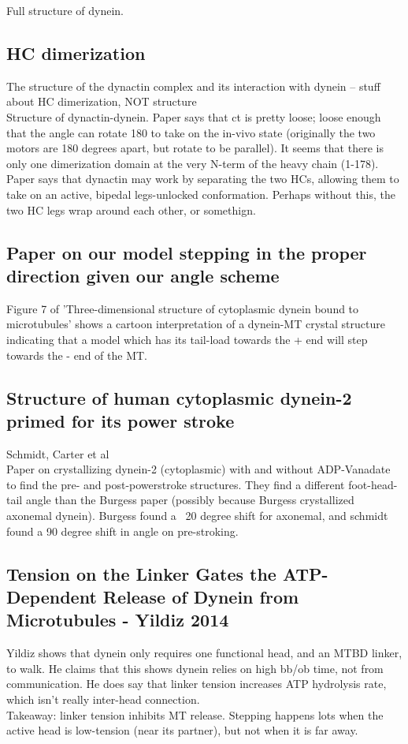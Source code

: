\documentclass[10pt]{article} %
\begin{document}
Full structure of dynein.\\

\subsection{HC dimerization}
The structure of the dynactin complex and its interaction with dynein -- stuff about HC dimerization, NOT structure\\

Structure of dynactin-dynein. Paper says that ct is pretty loose; loose enough that the angle can rotate 180 to take on the in-vivo state (originally the two motors are 180 degrees apart, but rotate to be parallel). It seems that there is only one dimerization domain at the very N-term of the heavy chain (1-178).\\

Paper says that dynactin may work by separating the two HCs, allowing them to take on an active, bipedal legs-unlocked conformation. Perhaps without this, the two HC legs wrap around each other, or somethign.\\

\subsection{Paper on our model stepping in the proper direction given our angle scheme}
Figure 7 of 'Three-dimensional structure of cytoplasmic dynein bound to microtubules' shows a cartoon interpretation of a dynein-MT crystal structure indicating that a model which has its tail-load towards the + end will step towards the - end of the MT.\\

\subsection{Structure of human cytoplasmic dynein-2 primed for its power stroke}
Schmidt, Carter et al\\

Paper on crystallizing dynein-2 (cytoplasmic) with and without ADP-Vanadate to find the pre- and post-powerstroke structures. They find a different foot-head-tail angle than the Burgess paper (possibly because Burgess crystallized axonemal dynein). Burgess found a ~20 degree shift for axonemal, and schmidt found a 90 degree shift in angle on pre-stroking.\\

\subsection{Tension on the Linker Gates the ATP-Dependent Release of Dynein from Microtubules - Yildiz 2014}
Yildiz shows that dynein only requires one functional head, and an MTBD linker, to walk. He claims that this shows dynein relies on high bb/ob time, not from communication. He does say that linker tension increases ATP hydrolysis rate, which isn't really inter-head connection.\\
Takeaway: linker tension inhibits MT release. Stepping happens lots when the active head is low-tension (near its partner), but not when it is far away.\\
\end{document}
